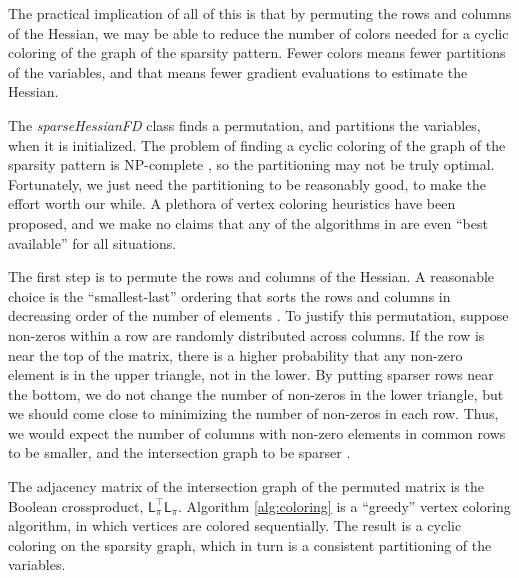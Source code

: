 \documentclass[article]{jss}\usepackage[]{graphicx}\usepackage[]{color}
\newcommand{\class}[1]{\textsl{#1}}
\newcommand{\hessLT}[2]{\mathsf{L}_{#1}#2}
\begin{document}
The practical implication of all of this is that by permuting the
rows and columns of the Hessian, we may be able to reduce the
number of colors needed for a cyclic coloring of the graph of the
sparsity pattern.  Fewer colors means fewer partitions of the
variables, and that means fewer gradient evaluations to
estimate the Hessian.

The \class{sparseHessianFD}
class finds a permutation, and partitions the variables, when it is
initialized. The problem of finding a cyclic
coloring of the graph of the sparsity pattern is NP-complete
\citep{ColemanCai1986}, so the partitioning may not be truly optimal.
Fortunately, we just need the partitioning to be reasonably good, to
make the effort worth our
while.  A plethora of vertex coloring heuristics have been proposed,
and we make no claims that any of the algorithms in  are even
``best available'' for all situations.

The first step is to permute the rows and columns of the Hessian.   A
reasonable choice is the ``smallest-last'' ordering that
sorts the rows and columns in decreasing order of the number of
elements \citep[Theorem 6.2]{ColemanMore1984}. To justify this permutation, suppose
non-zeros within a row are randomly distributed across
columns.  If the row is near the top of the matrix, there is a higher
probability that any non-zero element is in the upper triangle, not in
the lower.  By putting sparser rows near the bottom, we do not change
the number of non-zeros in the lower triangle, but we should come
close to minimizing the number of non-zeros in each row.  Thus, we
would expect the number of columns with non-zero elements in common
rows to be smaller, and the intersection graph to be sparser \citep{GebremedhinTarafdar2007}.

The adjacency matrix of the intersection graph of the permuted matrix
is the Boolean crossproduct, $\hessLT{\pi}{}^\top \hessLT{\pi}{}$.
Algorithm \ref{alg:coloring} is a ``greedy'' vertex coloring
algorithm, in which vertices are colored sequentially.  The result is
a cyclic coloring on the sparsity graph, which in turn is a consistent
partitioning of the variables.
\end{document}
